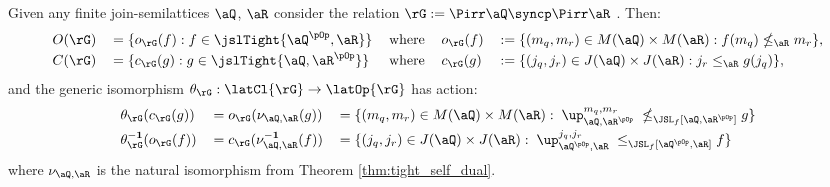 \documentclass{article}
\begin{document}
\begin{lemma}
\label{lem:sync_of_pirrs_open_closed}
Given any finite join-semilattices $\aQ$, $\aR$ consider the relation $\rG := \Pirr\aQ \syncp \Pirr\aR$ . Then:
\[
\begin{tabular}{lllll}
$O(\rG)$ 
& $= \{ o_\rG(f) : f \in \jslTight{\aQ^{\pOp},\aR} \}$
& where 
& $o_\rG(f)$ & $:= \{ (m_q,m_r) \in M(\aQ) \times M(\aR) : f(m_q) \nleq_\aR m_r \}$,
\\[0.5ex]
$C(\rG)$
& $= \{  c_\rG(g) : g \in \jslTight{\aQ,\aR^{\pOp}} \}$
& where 
& $c_\rG(g)$ & $:= \{ (j_q,j_r) \in J(\aQ) \times J(\aR) : j_r \leq_\aR g(j_q)\}$,
\end{tabular}
\]
and the generic isomorphism $\theta_\rG : \latCl{\rG} \to \latOp{\rG}$ has action:
\[
\begin{tabular}{lll}
$\theta_\rG(c_\rG(g))$
& $= o_\rG(\nu_{\aQ,\aR}(g))$
& $= \{ (m_q,m_r) \in M(\aQ) \times M(\aR) : \; \up_{\aQ,\aR^{\pOp}}^{m_q,m_r}  \; \nleq_{\JSL_f[\aQ,\aR^{\pOp}]} g  \}$
\\[1ex]
$\theta_\rG^{\bf-1}(o_\rG(f))$
& $= c_\rG(\nu_{\aQ,\aR}^{\bf-1}(f))$
& $= \{ (j_q,j_r) \in J(\aQ) \times J(\aR) : \; \up_{\aQ^{\pOp},\aR}^{j_q,j_r} \; \leq_{\JSL_f[\aQ^{\pOp},\aR]} f \}$
\end{tabular}
\]
where $\nu_{\aQ,\aR}$ is the natural isomorphism from Theorem \ref{thm:tight_self_dual}.
\end{lemma}
\end{document}
